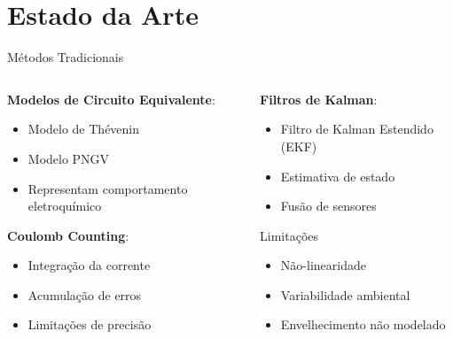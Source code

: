 \documentclass[aspectratio=169,xcolor=dvipsnames]{beamer}
\begin{document}
\section{Estado da Arte}
\begin{frame}{Métodos Tradicionais}
  \begin{columns}
    \begin{column}{0.48\textwidth}
      \textbf{Modelos de Circuito Equivalente}:
      \begin{itemize}
        \item Modelo de Thévenin
        \item Modelo PNGV
        \item Representam comportamento eletroquímico
      \end{itemize}
      
      \vspace{0.3cm}
      
      \textbf{Coulomb Counting}:
      \begin{itemize}
        \item Integração da corrente
        \item Acumulação de erros
        \item Limitações de precisão
      \end{itemize}
    \end{column}
    \begin{column}{0.48\textwidth}
      \textbf{Filtros de Kalman}:
      \begin{itemize}
        \item Filtro de Kalman Estendido (EKF)
        \item Estimativa de estado
        \item Fusão de sensores
      \end{itemize}
      
      \begin{alertblock}{Limitações}
        \begin{itemize}
          \item Não-linearidade
          \item Variabilidade ambiental
          \item Envelhecimento não modelado
        \end{itemize}
      \end{alertblock}
    \end{column}
  \end{columns}
\end{frame}
\end{document}
